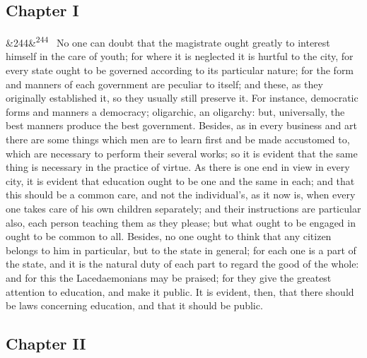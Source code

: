\documentclass[12pt]{article}
\newcommand{\para}[1][]{\par\noindent\ifx&#1&\else\textsuperscript{\footnotesize #1}~\fi}
\begin{document}
\subsection*{Chapter I}

\para[244] No one can doubt that the magistrate ought greatly to interest himself in the care of youth; for where it is neglected it is hurtful to the city, for every state ought to be governed according to its particular nature; for the form and manners of each government are peculiar to itself; and these, as they originally established it, so they usually still preserve it. For instance, democratic forms and manners a democracy; oligarchic, an oligarchy: but, universally, the best manners produce the best government. Besides, as in every business and art there are some things which men are to learn first and be made accustomed to, which are necessary to perform their several works; so it is evident that the same thing is necessary in the practice of virtue. As there is one end in view in every city, it is evident that education ought to be one and the same in each; and that this should be a common care, and not the individual's, as it now is, when every one takes care of his own children separately; and their instructions are particular also, each person teaching them as they please; but what ought to be engaged in ought to be common to all. Besides, no one ought to think that any citizen belongs to him in particular, but to the state in general; for each one is a part of the state, and it is the natural duty of each part to regard the good of the whole: and for this the Lacedaemonians may be praised; for they give the greatest attention to education, and make it public. It is evident, then, that there should be laws concerning education, and that it should be public.

\subsection*{Chapter II}
\end{document}
